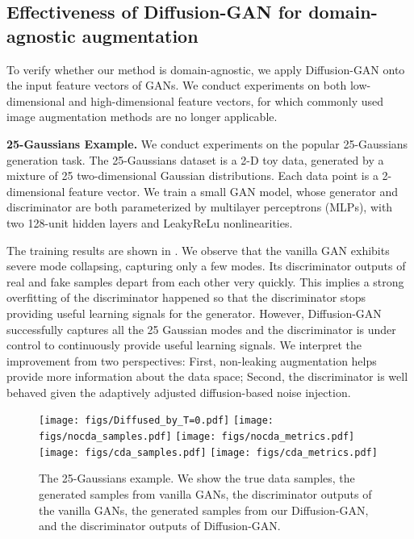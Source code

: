 \documentclass{article} \usepackage{iclr2023_conference,times}
\theoremstyle{plain}
\theoremstyle{definition}
\theoremstyle{remark}
\begin{document}
\subsection{Effectiveness of Diffusion-GAN for domain-agnostic augmentation} \label{sec:domain_agnostic_exp}

To verify whether our method is domain-agnostic, we apply Diffusion-GAN onto the input feature vectors of GANs. We conduct experiments on both low-dimensional and high-dimensional feature vectors, for which commonly used image augmentation methods are no longer applicable.

\textbf{25-Gaussians Example. } We conduct experiments on the popular 25-Gaussians generation task. The 25-Gaussians dataset is a 2-D toy data, generated by a mixture of 25 two-dimensional Gaussian distributions.  Each data point is a 2-dimensional feature vector.  We train a small GAN model, whose generator and discriminator are both parameterized by multilayer perceptrons (MLPs), with two 128-unit hidden layers and LeakyReLu nonlinearities. 

The training results are shown in . We observe that the vanilla GAN exhibits severe mode collapsing, capturing only a few modes. Its discriminator outputs of real and fake samples depart from each other very quickly. This implies a strong overfitting of the discriminator happened so that the discriminator stops providing useful learning signals for the generator. However, Diffusion-GAN successfully captures all the 25 Gaussian modes and the discriminator is under control to continuously provide useful learning signals. We interpret the improvement from two perspectives: First, non-leaking augmentation helps provide more information about the data space; 
Second, the discriminator is well behaved given the adaptively adjusted diffusion-based noise injection. 

\begin{figure}[ht]
    \centering
    \texttt{[image: figs/Diffused\_by\_T=0.pdf]}
    \texttt{[image: figs/nocda\_samples.pdf]}
    \texttt{[image: figs/nocda\_metrics.pdf]}
    \texttt{[image: figs/cda\_samples.pdf]}
    \texttt{[image: figs/cda\_metrics.pdf]}
    \vspace{-1mm}
    \caption{ The 25-Gaussians example. We show the true data samples, the generated samples from vanilla GANs, the discriminator outputs of the vanilla GANs, the generated samples from our Diffusion-GAN, and the discriminator outputs of Diffusion-GAN.}
    \label{fig:toy_examples}
\end{figure}
\end{document}
